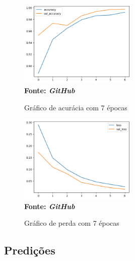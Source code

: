 \begin{figure}[ht]
 	\centering	
 	\caption[\hspace{0.1cm}Grade Computacional.]{Gráfico de acurácia com 7 épocas}
 	\vspace{-0.4cm}
 	\includegraphics[width=0.5\textwidth]{figuras/accuracy_7.png}
 	\captionsetup{justification=centering}
	\vspace{-0.2cm}
     \\\textbf{\footnotesize Fonte: \textit{GitHub}}
	\label{fig:acc7}
\end{figure}

\begin{figure}[ht]
 	\centering	
 	\caption[\hspace{0.1cm}Grade Computacional.]{Gráfico de perda com 7 épocas}
 	\vspace{-0.4cm}
 	\includegraphics[width=0.5\textwidth]{figuras/loss_7.png}
 	\captionsetup{justification=centering}
	\vspace{-0.2cm}
     \\\textbf{\footnotesize Fonte: \textit{GitHub}}
	\label{fig:loss7}
\end{figure}



\subsection{\esp Predições} \label{pred}

